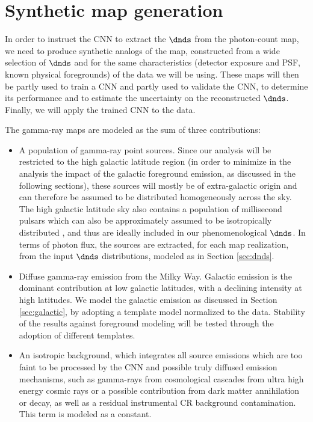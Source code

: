 \section{Synthetic map generation}
\label{sec:generation}

In order to instruct the CNN to extract the $\dnds$ from the \fermi photon-count map, we need to produce synthetic analogs of the map, constructed from a wide selection of $\dnds$ and for the same characteristics (detector exposure and PSF, known physical foregrounds) of the data we will be using. These maps will then be partly used to train a CNN and partly used to validate the CNN, to determine its performance and to
estimate the uncertainty on the reconstructed $\dnds$. Finally, we will apply the trained CNN to the \fermi data. 

The gamma-ray maps are modeled as the sum of three contributions:
\begin{itemize}
\item A population of gamma-ray point sources. Since our analysis will be restricted to the high galactic latitude region (in order to minimize in the analysis the impact of the galactic foreground emission, as discussed in the following sections), these sources will mostly be of extra-galactic origin and can therefore be assumed to be distributed homogeneously across the sky. 
The high galactic latitude sky also contains a population of millisecond pulsars which can also be approximately assumed to be isotropically distributed \cite{Fermi-LAT:2013svs}, and thus are ideally included in our phenomenological $\dnds$.
In terms of photon flux, the sources are extracted, for each map realization, from the input $\dnds$ distributions, modeled as in Section \ref{sec:dnds}.

\item Diffuse gamma-ray emission from the Milky Way. Galactic emission is the dominant contribution at low galactic latitudes, with a declining intensity at high latitudes. We model the galactic emission as discussed in Section \ref{sec:galactic}, by adopting a template model normalized to the \fermi data. 
Stability of the results against foreground modeling will be tested through the adoption of different templates.

\item An isotropic background, which integrates all source emissions which are too faint to be processed by the CNN and possible truly diffused emission mechanisms, such as gamma-rays from cosmological cascades from ultra high energy cosmic rays or a possible contribution from dark matter annihilation or decay, as well as a residual instrumental CR background contamination. This term is modeled as a constant.

\end{itemize}
